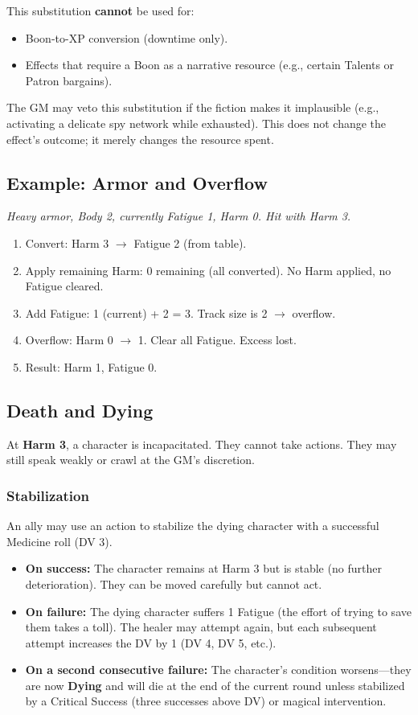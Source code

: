 This substitution \textbf{cannot} be used for:
\begin{itemize}
  \item Boon-to-XP conversion (downtime only).
  \item Effects that require a Boon as a narrative resource (e.g., certain Talents or Patron bargains).
\end{itemize}

The GM may veto this substitution if the fiction makes it implausible (e.g., activating a delicate spy network while exhausted). This does not change the effect's outcome; it merely changes the resource spent.

\subsection{Example: Armor and Overflow}

\textit{Heavy armor, Body 2, currently Fatigue 1, Harm 0. Hit with Harm 3.}

\begin{enumerate}
  \item Convert: Harm 3 $\rightarrow$ Fatigue 2 (from table).
  \item Apply remaining Harm: 0 remaining (all converted). No Harm applied, no Fatigue cleared.
  \item Add Fatigue: 1 (current) + 2 = 3. Track size is 2 $\rightarrow$ overflow.
  \item Overflow: Harm 0 $\rightarrow$ 1. Clear all Fatigue. Excess lost.
  \item Result: Harm 1, Fatigue 0.
\end{enumerate}

\subsection{Death and Dying}

At \textbf{Harm 3}, a character is incapacitated. They cannot take actions. They may still speak weakly or crawl at the GM's discretion.

\subsubsection{Stabilization}
An ally may use an action to stabilize the dying character with a successful Medicine roll (DV 3). 

\begin{itemize}
  \item \textbf{On success:} The character remains at Harm 3 but is stable (no further deterioration). They can be moved carefully but cannot act.
  \item \textbf{On failure:} The dying character suffers 1 Fatigue (the effort of trying to save them takes a toll). The healer may attempt again, but each subsequent attempt increases the DV by 1 (DV 4, DV 5, etc.).
  \item \textbf{On a second consecutive failure:} The character's condition worsens---they are now \textbf{Dying} and will die at the end of the current round unless stabilized by a Critical Success (three successes above DV) or magical intervention.
\end{itemize}


